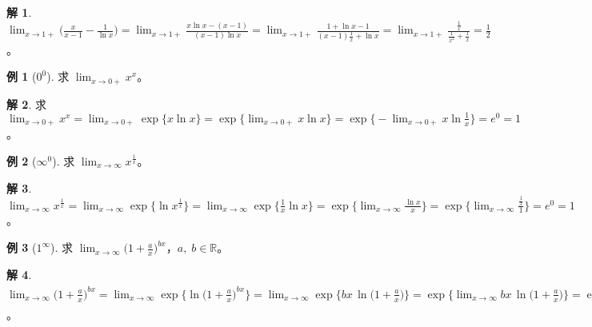 \documentclass[12pt]{extarticle}
\newcommand{\ds}{\displaystyle}
\theoremstyle{definition}
\newtheorem*{ex}{例}
\newtheorem*{sol}{解}
\begin{document}
\begin{sol}
  $\ds\lim_{x\to 1+}\Big(\frac{x}{x - 1} - \frac{1}{\ln x}\Big) = \lim_{x\to 1+}\frac{x\ln x - (x - 1)}{(x - 1)\ln x} = \lim_{x\to 1+}\frac{1 + \ln x - 1}{(x - 1)\frac{1}{x} + \ln x} = \lim_{x\to 1+}\frac{\frac{1}{x}}{\frac{1}{x^2} + \frac{1}{x}} = \frac{1}{2}$。
\end{sol}

\begin{ex}[$0^0$]
  求 $\ds\lim_{x\to 0+} x^x$。
\end{ex}

\begin{sol}
  求 $\ds\lim_{x\to 0+} x^x = \lim_{x\to 0+} \exp\{x\ln x\} = \exp\big\{\lim_{x\to 0+} x\ln x\big\} = \exp\Big\{-\lim_{x\to 0+} x\ln\frac{1}{x}\Big\} = e^0 = 1$。
\end{sol}

%

\begin{ex}[$\infty^0$]
  求 $\ds\lim_{x\to\infty} x^{\frac{1}{x}}$。 
\end{ex}

\begin{sol}
  $\ds\lim_{x\to\infty} x^{\frac{1}{x}} = \lim_{x\to\infty}\exp\big\{\ln x^{\frac{1}{x}}\big\} = \lim_{x\to\infty}\exp\Big\{\frac{1}{x}\ln x\Big\} = \exp\Big\{\lim_{x\to\infty}\frac{\ln x}{x}\Big\} = \exp\Big\{\lim_{x\to\infty}\frac{\frac{1}{x}}{1}\Big\} = e^0 = 1$。 
\end{sol}

\begin{ex}[$1^\infty$]
  求 $\ds\lim_{x\to\infty} \Big(1 + \frac{a}{x}\Big)^{bx}$，$a,\;b\in\mathbb{R}$。
\end{ex}

\begin{sol}
  $\ds\lim_{x\to\infty} \Big(1 + \frac{a}{x}\Big)^{bx} = \lim_{x\to\infty} \exp\Big\{\ln\big(1 + \frac{a}{x}\big)^{bx}\Big\} = \lim_{x\to\infty} \exp\Big\{bx\,\ln\big(1 + \frac{a}{x}\big)\Big\} = \exp\Big\{\lim_{x\to\infty} bx\,\ln\big(1 + \frac{a}{x}\big)\Big\} = \exp\bigg\{b\lim_{x\to\infty}\frac{\ln(1 + \frac{a}{x})}{\frac{1}{x}}\bigg\} = \exp\bigg\{b\lim_{x\to\infty}\frac{\frac{1}{1 + \frac{a}{x}}\cdot\frac{-a}{x^2}}{\frac{-1}{x^2}}\bigg\} = \exp\bigg\{b\lim_{x\to\infty}\frac{a}{1 + \frac{a}{x}}\bigg\} = e^{ba}$。
\end{sol}
\end{document}
